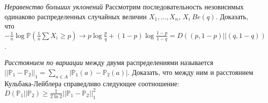 \begin{problem} \textit{Неравенство больших уклонений}
Рассмотрим последовательность незовисимых одинаково распределенных случайных величин $X_1, ..., X_n$, $X_i~Be(q)$. Доказать, что $-\frac{1}{n}\log \mathbb{P}(\frac{1}{n}\sum X_i \geq p) \rightarrow p\log \frac{p}{q} + (1-p)\log \frac{1-p}{1-q} = D((p, 1-p)||(q, 1-q))$.
\begin{ordre}
\end{ordre}
\end{problem}

\begin{problem} 
\textit{Расстоянием по вариации} между двумя распределениями называется $||\mathbb{P}_1 - \mathbb{P}_2||_1 = \sum_{a \in A} |\mathbb{P}_1(a) - \mathbb{P}_2(a)|$. Доказать, что между ним и расстоянием Кульбака-Лейблера справедливо следующее соотношение:\\
$D(\mathbb{P}_1||\mathbb{P}_2) \geq \frac{1}{2\ln2} ||\mathbb{P}_1 - \mathbb{P}_2||_1^2$
\end{problem}